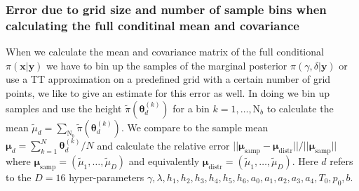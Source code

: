 \subsubsection{Error due to grid size and number of sample bins when calculating the full conditinal mean and covariance}
When we calculate the mean and covariance matrix of the full conditional $\pi(\bm{x}|\bm{y})$ we have to bin up the samples of the marginal posterior $\pi(\gamma, \delta |\bm{y})$ or use a TT approximation on a predefined grid with a certain number of grid points, we like to give an estimate for this error as well.
In doing we bin up samples and use the height $\tilde{\pi}(\bm{\theta}^{(k)}_d)$ for a bin $k = 1, \dots, \text{N}_b$ to calculate the mean $\tilde{\mu}_d = \sum_{\text{N}_b} \tilde{\pi}(\bm{\theta}^{(k)}_d) $.
We compare to the sample mean $\bm{\mu}_d = \sum_{k=1}^N \bm{\theta}^{(k)}_d/N$ and calculate the relative error $||\bm{\mu}_{\text{samp}} -\bm{\mu}_{\text{distr}} ||/ || \bm{\mu}_{\text{samp}} ||$
where $\bm{\mu}_{\text{samp}} =(\tilde{\mu}_1, \dots , \tilde{\mu}_D) $ and equivalently $\bm{\mu}_{\text{distr}} =(\tilde{\mu}_1, \dots , \tilde{\mu}_D) $.
Here $d$ refers to the $D = 16$ hyper-parameters $\gamma, \lambda, h_1, h_2, h_3, h_4, h_5, h_6, a_0, a_1, a_2, a_3, a_4, T_0, p_0, b$.

